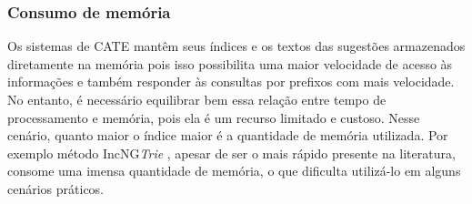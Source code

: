 \newpage
\newpage
\subsubsection{Consumo de memória}
\label{sec:memory_consumption}

Os sistemas de CATE mantêm seus índices e os textos das sugestões armazenados diretamente na memória pois isso possibilita uma maior velocidade de acesso às informações e também responder às consultas por prefixos com mais velocidade. No entanto, é necessário equilibrar bem essa relação entre tempo de processamento e memória, pois ela é um recurso limitado e custoso. Nesse cenário, quanto maior o índice maior é a quantidade de memória utilizada. Por exemplo método IncNG\textit{Trie} \citep{xiao2013efficient}, apesar de ser o mais rápido presente na literatura, consome uma imensa quantidade de memória, o que dificulta utilizá-lo em alguns cenários práticos.

